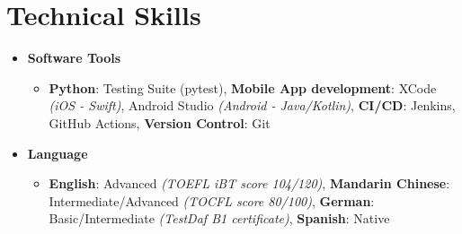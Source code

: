 \section{\sectionheading Technical Skills}

\begin{itemize}[leftmargin=0pt, label={}]%

\item{
{\sectionheading\large{\textbf{Software Tools}}}

    \vspace{-6pt}
    \begin{itemize}[label=\textbullet, leftmargin=*, noitemsep]
	    \item{\textbf{Python}: Testing Suite (pytest), \textbf{Mobile App development}: XCode \textit{(iOS - Swift)}, Android Studio \textit{(Android - Java/Kotlin)}, \textbf{CI/CD}: Jenkins, GitHub Actions, \textbf{Version Control}: Git}
    \end{itemize}
}

\item{
{\sectionheading\large{\textbf{Language}}}

    \vspace{-6pt}
    \begin{itemize}[label=\textbullet, leftmargin=*, noitemsep]
        \item{\textbf{English}: Advanced \textit{(TOEFL iBT score 104/120)}, \textbf{Mandarin Chinese}: Intermediate/Advanced \textit{(TOCFL score 80/100)}, \textbf{German}: Basic/Intermediate \textit{(TestDaf B1 certificate)}, \textbf{Spanish}: Native}
    \end{itemize}
}
\end{itemize}

